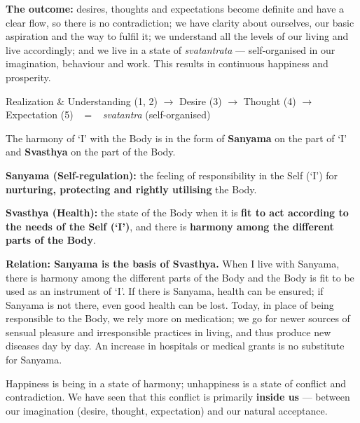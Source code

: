 \textbf{The outcome:} desires, thoughts and expectations become definite and
have a clear flow, so there is no contradiction; we have clarity about
ourselves, our basic aspiration and the way to fulfil it; we understand all
the levels of our living and live accordingly; and we live in a state of
\emph{svatantrata} --- self-organised in our imagination, behaviour and work.
This results in continuous happiness and prosperity.

\begin{keybox}
Realization \& Understanding (1, 2) $\rightarrow$ Desire (3) $\rightarrow$
Thought (4) $\rightarrow$ Expectation (5) \ $=$ \ \emph{svatantra}
(self-organised)
\end{keybox}


\ans The harmony of `I' with the Body is in the form of \textbf{Sanyama} on
the part of `I' and \textbf{Svasthya} on the part of the Body.

\begin{abul}
\item \textbf{Sanyama (Self-regulation):} the feeling of responsibility in the
      Self (`I') for \textbf{nurturing, protecting and rightly utilising} the
      Body.
\item \textbf{Svasthya (Health):} the state of the Body when it is \textbf{fit
      to act according to the needs of the Self (`I')}, and there is
      \textbf{harmony among the different parts of the Body}.
\end{abul}

\textbf{Relation: Sanyama is the basis of Svasthya.} When I live with Sanyama,
there is harmony among the different parts of the Body and the Body is fit to
be used as an instrument of `I'. If there is Sanyama, health can be ensured;
if Sanyama is not there, even good health can be lost. Today, in place of
being responsible to the Body, we rely more on medication; we go for newer
sources of sensual pleasure and irresponsible practices in living, and thus
produce new diseases day by day. An increase in hospitals or medical grants is
no substitute for Sanyama.


\ans Happiness is being in a state of harmony; unhappiness is a state of
conflict and contradiction. We have seen that this conflict is primarily
\textbf{inside us} --- between our imagination (desire, thought, expectation)
and our natural acceptance.

